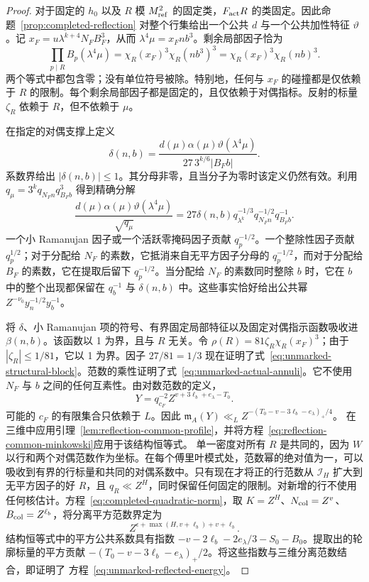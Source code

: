 \documentclass[11pt,a4paper]{article}
\numberwithin{equation}{section}
\numberwithin{figure}{section}
\theoremstyle{definition}
\theoremstyle{remark}
\begin{document}
\begin{proof}
对于固定的 $h_0$ 以及 $R$ 模 $M_{\rm ref}^2$ 的固定类，$F_{\rm act}R$ 的类固定。因此命题~\ref{prop:completed-reflection} 对整个行集给出一个公共 $d$ 与一个公共加性特征 $\vartheta$。记 $x_F=u\lambda^{k+4}N_FB_F^3$，从而 $\lambda^4\mu=x_Fnb^3$。剩余局部因子恰为
\[
 \prod_{p\mid R}B_p(\lambda^4\mu)
 =\chi_R(x_F)^3\chi_R(nb^3)^3
 =\chi_R(x_F)^3\chi_R(nb)^3.
\]
两个等式中都包含零；没有单位符号被除。特别地，任何与 $x_F$ 的碰撞都是仅依赖于 $R$ 的限制。每个剩余局部因子都是固定的，且仅依赖于对偶指标。反射的标量 $\zeta_R$ 依赖于 $R$，但不依赖于 $\mu$。

在指定的对偶支撑上定义
\[
 \delta(n,b)=
 \frac{d(\mu)\alpha(\mu)\vartheta(\lambda^4\mu)}
      {27\,3^{k/6}|B_Fb|}.
\]
系数界给出 $|\delta(n,b)|\le1$。其分母非零，且当分子为零时该定义仍然有效。利用 $q_\mu=3^kq_{N_Fn}q_{B_Fb}^3$ 得到精确分解
\[
 \frac{d(\mu)\alpha(\mu)\vartheta(\lambda^4\mu)}{\sqrt{q_\mu}}
 =27\delta(n,b)q_{\lambda^k}^{-1/3}
                  q_{N_Fn}^{-1/2}q_{B_Fb}^{-1}.
\]
一个小 Ramanujan 因子或一个活跃零掩码因子贡献 $q_p^{-1/2}$。一个整除性因子贡献 $q_p^{1/2}$；对于分配给 $N_F$ 的素数，它抵消来自无平方因子分母的 $q_p^{-1/2}$，而对于分配给 $B_F$ 的素数，它在提取后留下 $q_p^{-1/2}$。当分配给 $N_F$ 的素数同时整除 $b$ 时，它在 $b$ 中的整个出现都保留在 $q_b^{-1}$ 与 $\delta(n,b)$ 中。这些事实恰好给出公共幂 $Z^{-\nu_0}y_n^{-1/2}y_b^{-1}$。

将 $\delta$、小 Ramanujan 项的符号、有界固定局部特征以及固定对偶指示函数吸收进 $\beta(n,b)$。该函数以 1 为界，且与 $R$ 无关。令 $\rho(R)=81\zeta_R\chi_R(x_F)^3$；由于 $|\zeta_R|\le1/81$，它以 1 为界。因子 $27/81=1/3$ 现在证明了式~\eqref{eq:unmarked-structural-block}。范数的乘性证明了式~\eqref{eq:unmarked-actual-annuli}。它不使用 $N_F$ 与 $b$ 之间的任何互素性。由对数范数的定义，
\[
 Y=q_{c_F}^{-2}Z^{v+3\ell_b+e_\lambda-T_0}.
\]
可能的 $c_F$ 的有限集合只依赖于 $L$。因此
$\mathfrak m_A(Y)\ll_L Z^{-(T_0-v-3\ell_b-e_\lambda)_+/4}$。
在三维中应用引理~\ref{lem:reflection-common-profile}，并将方程~\eqref{eq:reflection-common-minkowski}应用于该结构恒等式。
单一密度对所有 $R$ 是共同的，因为 $W$ 以行和两个对偶范数作为坐标。在每个傅里叶模式处，范数幂的绝对值为一，可以吸收到有界的行标量和共同的对偶系数中。只有现在才将正的行范数从 $\mathcal I_H$ 扩大到无平方因子的好 $R$，且 $q_R\ll Z^H$，同时保留任何固定的限制。对新增的行不使用任何核估计。方程~\eqref{eq:completed-quadratic-norm}，取
$K=Z^H$、$N_{\rm col}=Z^v$、$B_{\rm col}=Z^{\ell_b}$，将分离平方范数界定为
\[
 Z^{\epsilon+\max(H,v+\ell_b)+v+\ell_b}.
\]
结构恒等式中的平方公共系数具有指数
$-v-2\ell_b-2e_\lambda/3-S_0-B_0$。提取出的轮廓标量的平方贡献
$-(T_0-v-3\ell_b-e_\lambda)_+/2$。将这些指数与三维分离范数结合，即证明了
方程~\eqref{eq:unmarked-reflected-energy}。
\end{proof}
\end{document}
